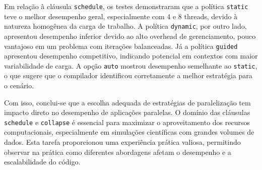 \documentclass[a4paper, 12pt]{article}
\begin{document}
	Em relação à cláusula \texttt{schedule}, os testes demonstraram que a política \texttt{static} teve o melhor desempenho geral, especialmente com 4 e 8 threads, devido à natureza homogênea da carga de trabalho. A política \texttt{dynamic}, por outro lado, apresentou desempenho inferior devido ao alto overhead de gerenciamento, pouco vantajoso em um problema com iterações balanceadas. Já a política \texttt{guided} apresentou desempenho competitivo, indicando potencial em contextos com maior variabilidade de carga. A opção \texttt{auto} mostrou desempenho semelhante ao \texttt{static}, o que sugere que o compilador identificou corretamente a melhor estratégia para o cenário.
	
	Com isso, conclui-se que a escolha adequada de estratégias de paralelização tem impacto direto no desempenho de aplicações paralelas. O domínio das cláusulas \texttt{schedule} e \texttt{collapse} é essencial para maximizar o aproveitamento dos recursos computacionais, especialmente em simulações científicas com grandes volumes de dados. Esta tarefa proporcionou uma experiência prática valiosa, permitindo observar na prática como diferentes abordagens afetam o desempenho e a escalabilidade do código.
\end{document}
